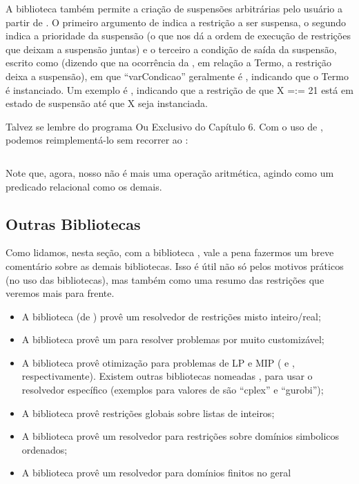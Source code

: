 A biblioteca  também permite a criação de suspensões arbitrárias pelo usuário a
partir de . O primeiro argumento de  indica a restrição a ser
suspensa, o segundo indica a prioridade da suspensão (o que nos dá a ordem de execução de restrições
que deixam a suspensão juntas) e o terceiro a condição de saída da suspensão, escrito como
 (dizendo que na ocorrência da , em relação a Termo, a restrição deixa a suspensão), em que
``var{Condicao}'' geralmente é , indicando que o Termo é instanciado.
Um exemplo é , indicando que a restrição de que X =:= 21 está em estado de suspensão até que X seja instanciada.

Talvez se lembre do programa Ou Exclusivo do Capítulo 6. Com o uso de , podemos reimplementá-lo sem recorrer ao :
\vspace{3cm}

    \begin{listing}
\inputminted{prolog}{../Exemplos/Cap8/prog7_xor.pl}
    \end{listing}

Note que, agora, nosso  não é mais uma operação aritmética, agindo como um predicado relacional como os demais.

\subsection{Outras Bibliotecas}

Como lidamos, nesta seção, com a biblioteca , vale a pena fazermos um breve
comentário sobre as demais bibliotecas. Isso é útil não só pelos motivos práticos (no uso das
bibliotecas), mas também como uma resumo das restrições que veremos mais para frente.

\begin{itemize}
  \item A biblioteca  (de ) provê um resolvedor de restrições misto inteiro/real;
  \item A biblioteca  provê um  para resolver
    problemas por   muito customizável;
  \item A biblioteca  provê otimização para problemas de LP e MIP ( e , respectivamente). Existem outras bibliotecas
  nomeadas , para usar o resolvedor  específico (exemplos para
  valores de  são ``cplex'' e ``gurobi'');
  \item A biblioteca  provê restrições globais sobre listas de inteiros;
  \item A biblioteca  provê um resolvedor para restrições sobre domínios
    simbolicos ordenados;
  \item A biblioteca  provê um resolvedor para domínios finitos no geral
\end{itemize}

